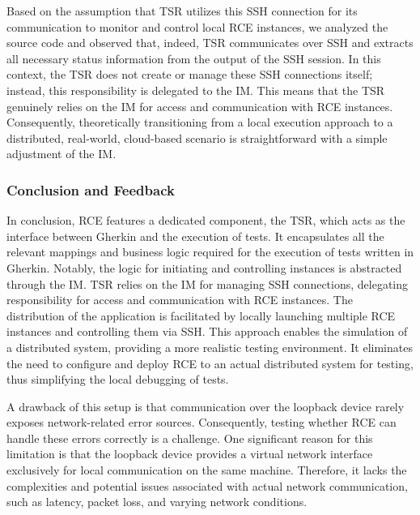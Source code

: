 Based on the assumption that \ac{TSR} utilizes this \ac{SSH} connection for its communication to monitor and control local \ac{RCE} instances, we analyzed the source code and observed that, indeed, \ac{TSR} communicates over \ac{SSH} and extracts all necessary status information from the output of the \ac{SSH} session. In this context, the \ac{TSR} does not create or manage these \ac{SSH} connections itself; instead, this responsibility is delegated to the \ac{IM}. This means that the \ac{TSR} genuinely relies on the \ac{IM} for access and communication with \ac{RCE} instances. Consequently, theoretically transitioning from a local execution approach to a distributed, real-world, cloud-based scenario is straightforward with a simple adjustment of the \ac{IM}.


\subsubsection{Conclusion and Feedback}
In conclusion, RCE features a dedicated component, the \acf{TSR}, which acts as the interface between Gherkin and the execution of tests. It encapsulates all the relevant mappings and business logic required for the execution of tests written in Gherkin. Notably, the logic for initiating and controlling instances is abstracted through the \acf{IM}. \ac{TSR} relies on the \ac{IM} for managing \ac{SSH} connections, delegating responsibility for access and communication with RCE instances. The distribution of the application is facilitated by locally launching multiple RCE instances and controlling them via \ac{SSH}. This approach enables the simulation of a distributed system, providing a more realistic testing environment. It eliminates the need to configure and deploy RCE to an actual distributed system for testing, thus simplifying the local debugging of tests.

A drawback of this setup is that communication over the loopback device rarely exposes network-related error sources. Consequently, testing whether RCE can handle these errors correctly is a challenge. One significant reason for this limitation is that the loopback device provides a virtual network interface exclusively for local communication on the same machine. Therefore, it lacks the complexities and potential issues associated with actual network communication, such as latency, packet loss, and varying network conditions.


